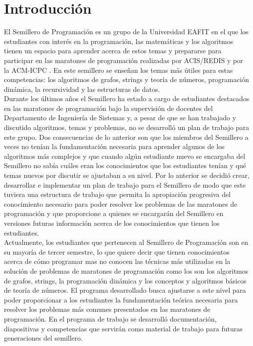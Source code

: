 \documentclass[conference]{IEEEtran}
\begin{document}
\section{Introducción}
El Semillero de Programación es un grupo de la Universidad EAFIT en el que los estudiantes con interés en la programación, las matemáticas y los algoritmos tienen un espacio para aprender acerca de estos temas y prepararse para participar en las maratones de programación realizadas por ACIS/REDIS \cite{ACIS} y por la ACM-ICPC \cite{ICPC}. En este semillero se enseñan los temas más útiles \cite{Halim, Halim2, ProgrammingChallenges, Brasil} para estas competencias: los algoritmos de grafos, strings y teoría de números, programación dinámica, la recursividad y las estructuras de datos.\\
Durante los últimos años el Semillero ha estado a cargo de estudiantes destacados en las maratones de programación bajo la supervisión de docentes del Departamento de Ingeniería de Sistemas y, a pesar de que se han trabajado y discutido algoritmos, temas y problemas, no se desarrolló un plan de trabajo para este grupo. Dos consecuencias de lo anterior son que los miembros del Semillero a veces no tenían la fundamentación necesaria para aprender algunos de los algoritmos más complejos y que cuando algún estudiante nuevo se encargaba del Semillero no sabía cuáles eran los conocimientos que los estudiantes tenían y qué temas nuevos por discutir se ajustaban a su nivel. Por lo anterior se decidió crear, desarrollar e implementar un plan de trabajo para el Semillero de modo que este tuviera una estructura de trabajo que permita la apropiación progresiva del conocimiento necesario para poder resolver los problemas de las maratones de programación y que proporcione a quienes se encargarán del Semillero en versiones futuras información acerca de los conocimientos que tienen los estudiantes.\\
Actualmente, los estudiantes que pertenecen al Semillero de Programación son en su mayoría de tercer semestre, lo que quiere decir que tienen conocimientos acerca de cómo programar mas no conocen las técnicas más utilizadas en la solución de problemas de maratones de programación como los son los algoritmos de grafos, strings, la programación dinámica y los conceptos y algoritmos básicos de teoría de números. El programa desarrollado busca ajustarse a este nivel para poder proporcionar a los estudiantes la fundamentación teórica necesaria para resolver los problemas más comunes presentados en las maratones de programación. En el programa de trabajo se desarrolló documentación, diapositivas y competencias que servirán como material de trabajo para futuras generaciones del semillero.\\
\end{document}
